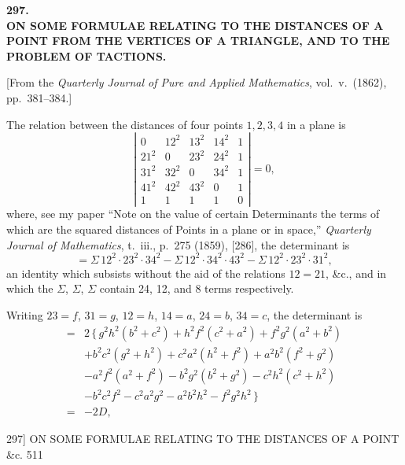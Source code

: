 \documentclass[11pt]{article}
\begin{document}
\bigskip
\begin{center}
\textbf{\large 297.}\\[1ex]
\textbf{ON SOME FORMULAE RELATING TO THE DISTANCES OF A\\ POINT FROM THE VERTICES OF A TRIANGLE, AND TO THE\\ PROBLEM OF TACTIONS.}
\end{center}

\begin{center}\small
[From the \emph{Quarterly Journal of Pure and Applied Mathematics}, vol.\ v.\ (1862), pp.\ 381--384.]
\end{center}

\medskip
The relation between the distances of four points $1,2,3,4$ in a plane is
\[ \left| \begin{array}{ccccc} 0 & 12^{2} & 13^{2} & 14^{2} & 1\\ 21^{2} & 0 & 23^{2} & 24^{2} & 1\\ 31^{2} & 32^{2} & 0 & 34^{2} & 1\\ 41^{2} & 42^{2} & 43^{2} & 0 & 1\\ 1 & 1 & 1 & 1 & 0 \end{array} \right| = 0, \]
where, see my paper ``Note on the value of certain Determinants the terms of which are the squared distances of Points in a plane or in space,'' \emph{Quarterly Journal of Mathematics}, t.\ iii., p.\ 275 (1859), [286], the determinant is
\[ = \Sigma\, 12^{2}\cdot 23^{2}\cdot 34^{2}-\Sigma\, 12^{2}\cdot 34^{2}\cdot 43^{2}-\Sigma\, 12^{2}\cdot 23^{2}\cdot 31^{2}, \]
an identity which subsists without the aid of the relations $12=21$, \&c., and in which the $\Sigma$, $\Sigma$, $\Sigma$ contain 24, 12, and 8 terms respectively.

Writing $23=f$, $31=g$, $12=h$, $14=a$, $24=b$, $34=c$, the determinant is
\[ \begin{aligned}
={}& 2\,\{\,g^{2}h^{2}(b^{2}+c^{2})+h^{2}f^{2}(c^{2}+a^{2})+f^{2}g^{2}(a^{2}+b^{2})\\
&+b^{2}c^{2}(g^{2}+h^{2})+c^{2}a^{2}(h^{2}+f^{2})+a^{2}b^{2}(f^{2}+g^{2})\\
&-a^{2}f^{2}(a^{2}+f^{2})-b^{2}g^{2}(b^{2}+g^{2})-c^{2}h^{2}(c^{2}+h^{2})\\
&-b^{2}c^{2}f^{2}-c^{2}a^{2}g^{2}-a^{2}b^{2}h^{2}-f^{2}g^{2}h^{2}\,\}\\
={}& -2D,
\end{aligned} \]

\newpage
\begin{center}
297] \hfill ON SOME FORMULAE RELATING TO THE DISTANCES OF A POINT \&c. \hfill 511
\end{center}
\end{document}
